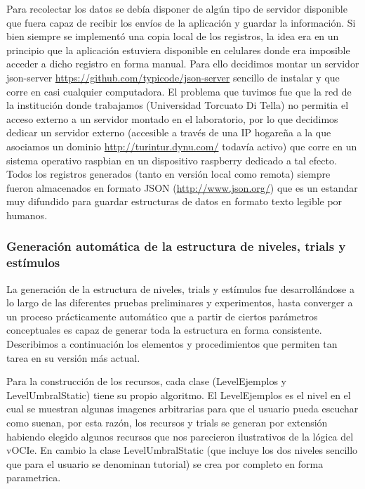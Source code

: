 \documentclass{article}
\begin{document}
    Para recolectar los datos se debía disponer de algún tipo de servidor disponible que fuera capaz de recibir los envíos de la aplicación y guardar la información. Si bien siempre se implementó una copia local de los registros, la idea era en un principio que la aplicación estuviera disponible en celulares donde era imposible acceder a dicho registro en forma manual. Para ello decidimos montar un servidor json-server \url{https://github.com/typicode/json-server} sencillo de instalar y que corre en casi cualquier computadora. El problema que tuvimos fue que la red de la institución donde trabajamos (Universidad Torcuato Di Tella) no permitia el acceso externo a un servidor montado en el laboratorio, por lo que decidimos dedicar un servidor externo (accesible a través de una IP hogareña a la que asociamos un dominio \url{http://turintur.dynu.com/} todavía activo) que corre en un sistema operativo raspbian en un dispositivo raspberry dedicado a tal efecto. Todos los registros generados (tanto en versión local como remota) siempre fueron almacenados en formato JSON (\url{http://www.json.org/}) que es un estandar muy difundido para guardar estructuras de datos en formato texto legible por humanos. 
    
    \subsubsection{Generación automática de la estructura de niveles, trials y estímulos}
    
    La generación de la estructura de niveles, trials y estímulos fue desarrollándose a lo largo de las diferentes pruebas preliminares y experimentos, hasta converger a un proceso prácticamente automático que a partir de ciertos parámetros conceptuales es capaz de generar toda la estructura en forma consistente. Describimos a continuación los elementos y procedimientos que permiten tan tarea en su versión más actual. 
    
    Para la construcción de los recursos, cada clase (LevelEjemplos y LevelUmbralStatic) tiene su propio algoritmo. El LevelEjemplos es el nivel en el cual se muestran algunas imagenes arbitrarias para que el usuario pueda escuchar como suenan, por esta razón, los recursos y trials se generan por extensión habiendo elegido algunos recursos que nos parecieron ilustrativos de la lógica del vOCIe. En cambio la clase LevelUmbralStatic (que incluye los dos niveles sencillo que para el usuario se denominan tutorial) se crea por completo en forma parametrica. 
    
\end{document}
